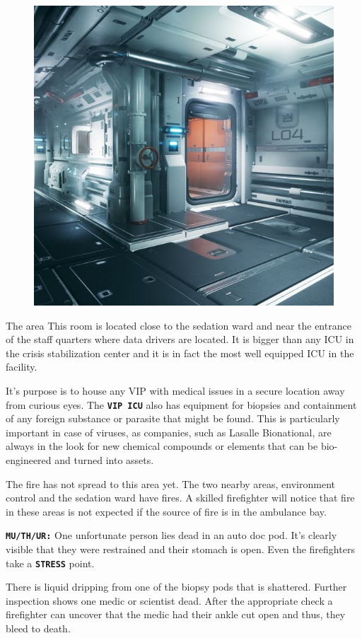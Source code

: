 \begin{figure}
    \centering
    \includegraphics[width=.4\textwidth]{img/bg/corridor.jpg}
\end{figure}


\begin{rpg-commentbox}{The area}
    This room is located close to the sedation ward and near the entrance of the staff quarters where data drivers are located. It is bigger than any ICU in the crisis stabilization center and it is in fact the most well equipped ICU in the facility.

    It's purpose is to house any VIP with medical issues in a secure location away from curious eyes. The \texttt{\textbf{VIP ICU}} also has equipment for biopsies and containment of any foreign substance or parasite that might be found. 
    This is particularly important in case of viruses, as companies, such as Lasalle Bionational, are always in the look for new chemical compounds or elements that can be bio-engineered and turned into assets.

    The fire has not spread to this area yet. The two nearby areas, environment control and the sedation ward have fires. A skilled firefighter will notice that fire in these areas is not expected if the source of fire is in the ambulance bay.

    \texttt{\textbf{MU/TH/UR:}} One unfortunate person lies dead in an auto doc pod.
    It's clearly visible that they were restrained and their stomach is open. Even the firefighters take a \texttt{\textbf{STRESS}} point.

    There is liquid dripping from one of the biopsy pods that is shattered. Further inspection shows one medic or scientist dead. After the appropriate check a firefighter can uncover that the medic had their ankle cut open and thus, they bleed to death. 
\end{rpg-commentbox}   

\newsect


